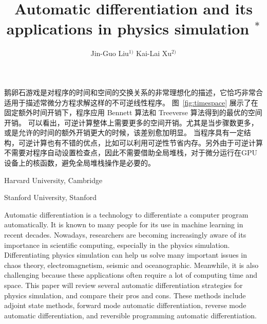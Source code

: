 \documentclass[A4,twoside,UTF8]{ctexart}
\begin{document}
鹅卵石游戏是对程序的时间和空间的交换关系的非常理想化的描述，它恰巧非常合适用于描述常微分方程求解这样的不可逆线性程序。
图~\ref{fig:timespace} 展示了在固定额外时间开销下，程序应用 Bennett 算法和 Treeverse 算法得到的最优的空间开销。
可以看出，可逆计算整体上需要更多的空间开销。尤其是当步骤数更多，或是允许的时间的额外开销更大的时候，该差别愈加明显。
当程序具有一定结构，可逆计算也有不错的优点，比如可以利用可逆性节省内存。另外由于可逆计算不需要对程序自动设置检查点，因此不需要借助全局堆栈，对于微分运行在GPU设备上的核函数，避免全局堆栈操作是必要的。


%
%
%
%
%

\bigskip




\newpage

\title{Automatic differentiation and its applications in physics simulation $^{\ast}$}%

\efund{}

\author{Jin-Guo Liu$^{1)}$ \quad Kai-Lai Xu$^{2)}$}

\address{1)}{Harvard University, Cambridge }
\address{2)}{Stanford University, Stanford }




\eabstract{}

\small Automatic differentiation is a technology to differentiate a computer program automatically. It is known to many people for its use in machine learning in recent decades. Nowadays, researchers are becoming increasingly aware of its importance in scientific computing, especially in the physics simulation. Differentiating physics simulation can help us solve many important issues in chaos theory, electromagnetism, seismic and oceanographic. Meanwhile, it is also challenging because these applications often require a lot of computing time and space. This paper will review several automatic differentiation strategies for physics simulation, and compare their pros and cons. These methods include adjoint state methods, forward mode automatic differentiation, reverse mode automatic differentiation, and reversible programming automatic differentiation.



\end{document}
